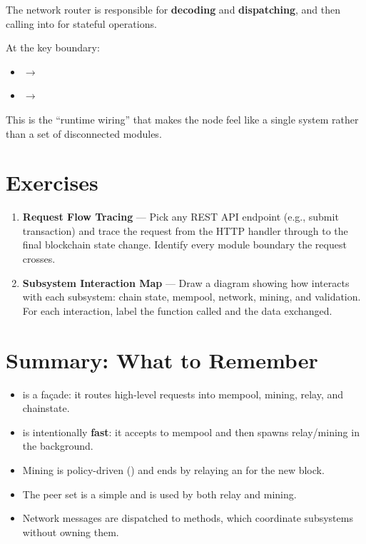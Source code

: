 The network router is responsible for \textbf{decoding} and \textbf{dispatching}, and then calling into  for stateful operations.

At the key boundary:

\begin{itemize}
  \item {} $\to$ 
  \item {} $\to$ 
\end{itemize}

This is the ``runtime wiring'' that makes the node feel like a single system rather than a set of disconnected modules.

\section{Exercises}
\label{sec:ch13-exercises}

\begin{enumerate}
  \item \textbf{Request Flow Tracing} --- Pick any REST API endpoint (e.g., submit transaction) and trace the request from the HTTP handler through  to the final blockchain state change. Identify every module boundary the request crosses.

  \item \textbf{Subsystem Interaction Map} --- Draw a diagram showing how  interacts with each subsystem: chain state, mempool, network, mining, and validation. For each interaction, label the function called and the data exchanged.
\end{enumerate}

\section{Summary: What to Remember}
\label{sec:ch13-summary-remember}

\begin{itemize}
  \item {} is a façade: it routes high-level requests into mempool, mining, relay, and chainstate.
  \item {} is intentionally \textbf{fast}: it accepts to mempool and then spawns relay/mining in the background.
  \item Mining is policy-driven () and ends by relaying an  for the new block.
  \item The peer set is a simple  and is used by both relay and mining.
  \item Network messages are dispatched to  methods, which coordinate subsystems without owning them.
\end{itemize}

